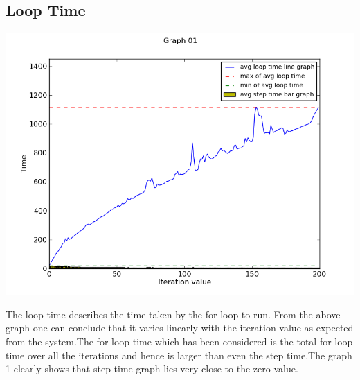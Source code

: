 \documentclass[11pt]{article}
\begin{document}
\subsection{Loop Time}
\begin{center}
  \includegraphics[scale=.5]{g03_plot01.png}
\end{center}
The loop time describes the time taken by the for loop to run. From the above graph one can conclude that it varies linearly with the iteration value as expected from the system.The for loop time which has been considered is the total for loop time over all the iterations and hence is larger than even the step time.The graph 1 clearly shows that step time graph lies very close to the zero value.
\end{document}
